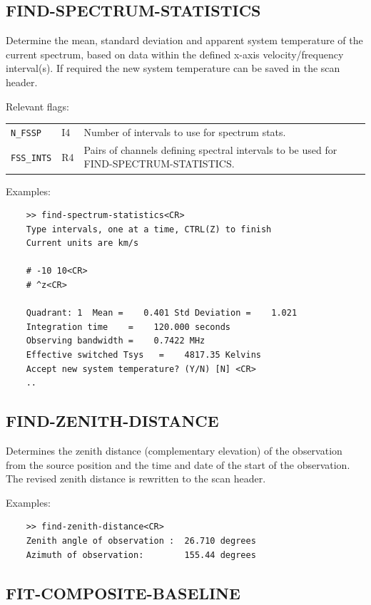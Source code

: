 \documentclass[11pt,twoside]{report}
\begin{document}
\subsection{FIND-SPECTRUM-STATISTICS} 

Determine the mean, standard deviation and apparent system temperature of
the current spectrum, based on data within the defined x-axis
velocity/frequency interval(s). If required the new system temperature can
be saved in the scan header.

Relevant flags:\\
\begin{tabular}{lll}
  \verb+N_FSSP+    & I4 & Number of intervals to use for spectrum stats.\\
  \verb+FSS_INTS+  & R4 & \parbox[t]{4in}
                          {Pairs of channels defining spectral intervals to 
                           be used for FIND-SPECTRUM-STATISTICS.}
\end{tabular}

Examples:
\begin{verbatim}
    >> find-spectrum-statistics<CR>
    Type intervals, one at a time, CTRL(Z) to finish
    Current units are km/s  

    # -10 10<CR>
    # ^z<CR>

    Quadrant: 1  Mean =    0.401 Std Deviation =    1.021
    Integration time    =    120.000 seconds
    Observing bandwidth =    0.7422 MHz
    Effective switched Tsys   =    4817.35 Kelvins
    Accept new system temperature? (Y/N) [N] <CR>
    ..
\end{verbatim}

\subsection{FIND-ZENITH-DISTANCE} 

Determines the zenith distance (complementary elevation) of the observation
from the source position and the time and date of the start of the
observation. The revised zenith distance is rewritten to the scan header.

Examples:
\begin{verbatim}
    >> find-zenith-distance<CR>
    Zenith angle of observation :  26.710 degrees
    Azimuth of observation:        155.44 degrees
\end{verbatim}

\subsection{FIT-COMPOSITE-BASELINE} 
\end{document}
